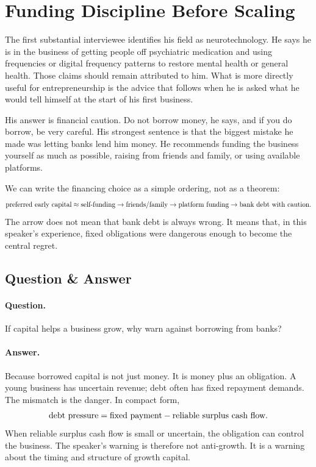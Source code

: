 \section{Funding Discipline Before Scaling}

The first substantial interviewee identifies his field as neurotechnology. He says he is in the business of getting people off psychiatric medication and using frequencies or digital frequency patterns to restore mental health or general health. Those claims should remain attributed to him. What is more directly useful for entrepreneurship is the advice that follows when he is asked what he would tell himself at the start of his first business.

His answer is financial caution. Do not borrow money, he says, and if you do borrow, be very careful. His strongest sentence is that the biggest mistake he made was letting banks lend him money. He recommends funding the business yourself as much as possible, raising from friends and family, or using available platforms.

We can write the financing choice as a simple ordering, not as a theorem:
\begin{equation}
\hbox{preferred early capital}
  \approx
  \hbox{self-funding}
  \rightarrow
  \hbox{friends/family}
  \rightarrow
  \hbox{platform funding}
  \rightarrow
  \hbox{bank debt with caution}.
\end{equation}
The arrow does not mean that bank debt is always wrong. It means that, in this speaker's experience, fixed obligations were dangerous enough to become the central regret.

\subsection{Question \& Answer}

\paragraph{Question.}
If capital helps a business grow, why warn against borrowing from banks?

\paragraph{Answer.}
Because borrowed capital is not just money. It is money plus an obligation. A young business has uncertain revenue; debt often has fixed repayment demands. The mismatch is the danger. In compact form,
\begin{equation}
\hbox{debt pressure}
  =
  \hbox{fixed payment}
  -
  \hbox{reliable surplus cash flow}.
\end{equation}
When reliable surplus cash flow is small or uncertain, the obligation can control the business. The speaker's warning is therefore not anti-growth. It is a warning about the timing and structure of growth capital.

